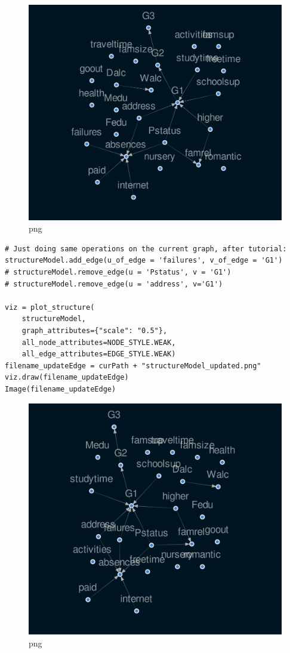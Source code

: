 \documentclass[
]{article}
\begin{document}
\begin{figure}
\centering
\includegraphics{FirstCausalNexTutorial_files/FirstCausalNexTutorial_96_0.png}
\caption{png}
\end{figure}

\begin{verbatim}
# Just doing same operations on the current graph, after tutorial:
structureModel.add_edge(u_of_edge = 'failures', v_of_edge = 'G1')
# structureModel.remove_edge(u = 'Pstatus', v = 'G1')
# structureModel.remove_edge(u = 'address', v='G1')

viz = plot_structure(
    structureModel,
    graph_attributes={"scale": "0.5"},
    all_node_attributes=NODE_STYLE.WEAK,
    all_edge_attributes=EDGE_STYLE.WEAK)
filename_updateEdge = curPath + "structureModel_updated.png"
viz.draw(filename_updateEdge)
Image(filename_updateEdge)
\end{verbatim}

\begin{figure}
\centering
\includegraphics{FirstCausalNexTutorial_files/FirstCausalNexTutorial_97_0.png}
\caption{png}
\end{figure}
\end{document}
